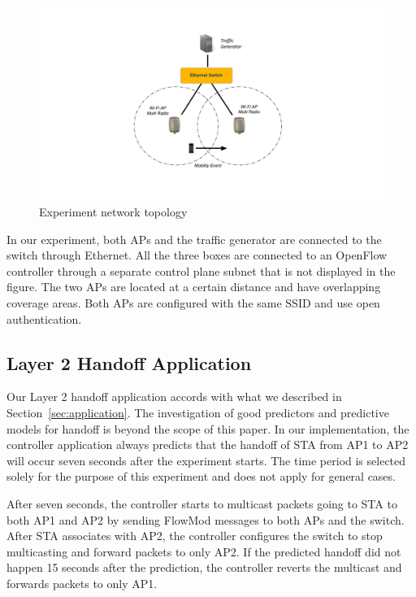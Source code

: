 \begin{figure}
\centering
\includegraphics[width=1.0\textwidth]{figures/topology}
\caption{Experiment network topology}
\label{fig:topology}
\end{figure}

In our experiment, both APs and the traffic generator are connected to the switch
through  Ethernet. All the three boxes are connected to an OpenFlow
controller through a separate control plane subnet that is not displayed in the
figure.  The two APs are located at a certain distance and have overlapping coverage areas.  Both APs are configured with
the same SSID and use open authentication. 

\subsection{Layer 2 Handoff Application}
Our Layer 2 handoff application accords with what we described in
Section~\ref{sec:application}. The investigation of good
predictors and predictive models for handoff is beyond the scope of this paper.
In our implementation, the controller application always predicts that the
handoff of STA from AP1 to AP2 will occur seven seconds after the experiment starts.
The time period is selected solely for the purpose of this experiment and
does not apply for general cases. 
 
After seven seconds, the controller starts to multicast packets going to STA to both
AP1 and AP2 by sending FlowMod messages to both APs and the switch. After STA
associates with AP2, the controller configures the switch to stop multicasting
and forward packets to only AP2. If the predicted handoff did not happen 15
seconds after the prediction, the controller reverts the multicast and forwards
packets to only AP1.



